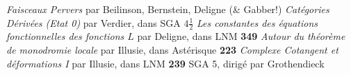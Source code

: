 \documentclass[deligne.tex]{subfiles}
\begin{document}
\begin{thebibliography}{SGA5}
	 \textit{Faisceaux Pervers}
	par Beilinson, Bernstein, Deligne (\& Gabber!)
	 \textit{Catégories Dérivées (Etat 0)} par Verdier,
	dans SGA $4\frac12$
	 \emph{Les constantes des équations fonctionnelles des fonctions $L$} par Deligne, dans LNM \textbf{349}
	 \emph{Autour du théorème de monodromie locale} par Illusie, dans Astérisque \textbf{223}
	 \emph{Complexe Cotangent et déformations I} par Illusie, dans LNM \textbf{239}
	 SGA 5, dirigé par Grothendieck
\end{thebibliography}
\end{document}
